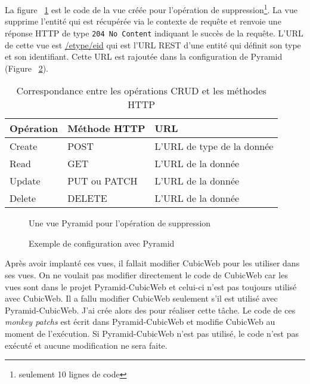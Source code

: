 La figure ~\ref{fig:delete} est le code de la vue créée pour l'opération de
suppression\footnote{seulement 10 lignes de code}. La vue supprime l'entité qui
est récupérée via le contexte de requête et renvoie une réponse HTTP de type
\texttt{204~No~Content} indiquant le succès de la requête. L'URL de cette vue
est \url{/etype/eid} qui est l'URL REST d'une entité qui définit son type et
son identifiant. Cette URL est rajoutée dans la configuration de Pyramid
(Figure ~\ref{fig:figpyramidconf}).

    \begin{table} \centering
        \begin{tabular}{|>{\centering\arraybackslash}m{}
            |>{\centering\arraybackslash}m{}
        |>{\centering\arraybackslash}m{}|} \hline \cellcolor{Gray}
        \textbf{Opération} & \cellcolor{Gray} \textbf{Méthode HTTP} &
        \cellcolor{Gray} \textbf{URL} \\ \hline Create & POST & L'URL de type
        de la donnée\\ \hline Read   & GET & L'URL de la donnée\\ \hline Update
                                      & PUT ou PATCH & L'URL de la donnée \\
        \hline Delete & DELETE & L'URL de la donnée \\ \hline \end{tabular}
    \caption{Correspondance entre les opérations CRUD et les méthodes HTTP}
\label{table:crud} \end{table}


\begin{figure}[htp] 
    \centering
    \caption{Une vue Pyramid pour l'opération de suppression} 
    \label{fig:delete} 
\end{figure}

\begin{figure}[htp] 
    \centering
    \caption{Exemple de configuration avec Pyramid} 
    \label{fig:figpyramidconf} 
\end{figure}



Après avoir implanté ces vues, il fallait modifier CubicWeb pour les utiliser
dans ses vues. On ne voulait pas modifier directement le code de CubicWeb car
les vues sont dans le projet Pyramid-CubicWeb et celui-ci n'est pas toujours
utilisé avec CubicWeb. Il a fallu modifier CubicWeb seulement s'il est utilisé
avec Pyramid-CubicWeb. J'ai crée alors des
 pour réaliser cette tâche. Le
code de ces \textit{monkey patchs} est écrit dans Pyramid-CubicWeb et modifie
CubicWeb au moment de l'exécution. Si Pyramid-CubicWeb n'est pas utilisé, le
code n'est pas exécuté et aucune modification ne sera faite.

